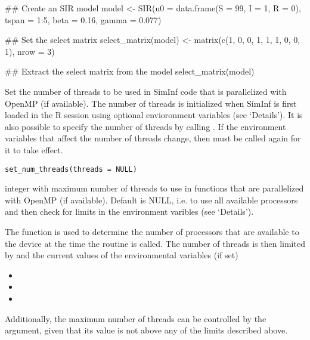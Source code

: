 \documentclass[letterpaper]{book}
\begin{document}
%
\begin{Examples}
\begin{ExampleCode}
## Create an SIR model
model <- SIR(u0 = data.frame(S = 99, I = 1, R = 0),
             tspan = 1:5, beta = 0.16, gamma = 0.077)

## Set the select matrix
select_matrix(model) <- matrix(c(1, 0, 0, 1, 1, 1, 0, 0, 1), nrow = 3)

## Extract the select matrix from the model
select_matrix(model)
\end{ExampleCode}
\end{Examples}
%
\begin{Description}
Set the number of threads to be used in SimInf code that is
parallelized with OpenMP (if available). The number of threads is
initialized when SimInf is first loaded in the R session using
optional envioronment variables (see `Details'). It is also
possible to specify the number of threads by calling
. If the environment variables that affect
the number of threads change, then  must be
called again for it to take effect.
\end{Description}
%
\begin{Usage}
\begin{verbatim}
set_num_threads(threads = NULL)
\end{verbatim}
\end{Usage}
%
\begin{Arguments}
\begin{ldescription}
\item[\code{threads}] integer with maximum number of threads to use in
functions that are parallelized with OpenMP (if
available). Default is NULL, i.e. to use all available
processors and then check for limits in the environment
varibles (see `Details').
\end{ldescription}
\end{Arguments}
%
\begin{Details}
The  function is used to determine the
number of processors that are available to the device at the time
the routine is called. The number of threads is then limited by
 and the current values of the
environmental variables (if set)

\begin{itemize}

\item{} 
\item{} 
\item{} 

\end{itemize}


Additionally, the maximum number of threads can be controlled by
the  argument, given that its value is not above any
of the limits described above.
\end{Details}
\end{document}
